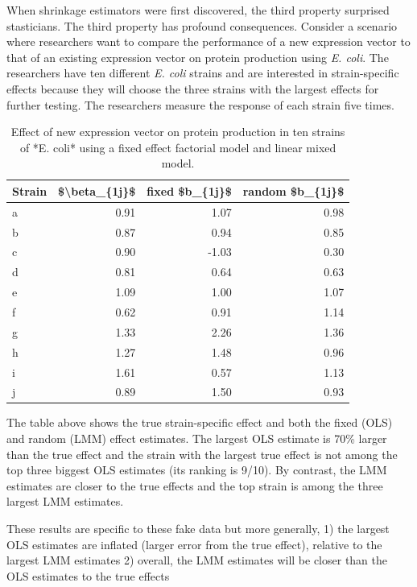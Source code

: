 \documentclass[]{book}
\begin{document}
When shrinkage estimators were first discovered, the third property
surprised stasticians. The third property has profound consequences.
Consider a scenario where researchers want to compare the performance of
a new expression vector to that of an existing expression vector on
protein production using \emph{E. coli}. The researchers have ten
different \emph{E. coli} strains and are interested in strain-specific
effects because they will choose the three strains with the largest
effects for further testing. The researchers measure the response of
each strain five times.

\begin{table}[t]

\caption{\label{tab:lmm-fish-passage}Effect of new expression vector on protein production in ten strains of *E. coli* using a fixed effect factorial model and linear mixed model.}
\centering
\begin{tabular}{l|r|r|r}
\hline
Strain & \$\textbackslash{}beta\_\{1j\}\$ & fixed \$b\_\{1j\}\$ & random \$b\_\{1j\}\$\\
\hline
a & 0.91 & 1.07 & 0.98\\
\hline
b & 0.87 & 0.94 & 0.85\\
\hline
c & 0.90 & -1.03 & 0.30\\
\hline
d & 0.81 & 0.64 & 0.63\\
\hline
e & 1.09 & 1.00 & 1.07\\
\hline
f & 0.62 & 0.91 & 1.14\\
\hline
g & 1.33 & 2.26 & 1.36\\
\hline
h & 1.27 & 1.48 & 0.96\\
\hline
i & 1.61 & 0.57 & 1.13\\
\hline
j & 0.89 & 1.50 & 0.93\\
\hline
\end{tabular}
\end{table}

The table above shows the true strain-specific effect and both the fixed
(OLS) and random (LMM) effect estimates. The largest OLS estimate is
70\% larger than the true effect and the strain with the largest true
effect is not among the top three biggest OLS estimates (its ranking is
9/10). By contrast, the LMM estimates are closer to the true effects and
the top strain is among the three largest LMM estimates.

These results are specific to these fake data but more generally, 1) the
largest OLS estimates are inflated (larger error from the true effect),
relative to the largest LMM estimates 2) overall, the LMM estimates will
be closer than the OLS estimates to the true effects
\end{document}
